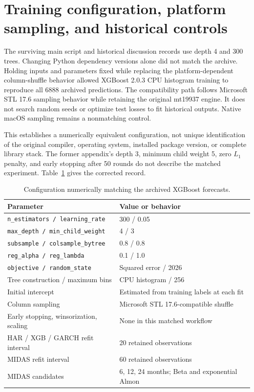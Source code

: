 \appendix
\section{Training configuration, platform sampling, and historical controls}
\label{app:training}
The surviving main script and historical discussion records use depth 4 and 300 trees. Changing Python dependency versions alone did not match the archive. Holding inputs and parameters fixed while replacing the platform-dependent column-shuffle behavior allowed XGBoost 2.0.3 CPU histogram training to reproduce all 6888 archived predictions. The compatibility path follows Microsoft STL 17.6 sampling behavior while retaining the original mt19937 engine. It does not search random seeds or optimize test losses to fit historical outputs. Native macOS sampling remains a nonmatching control.

This establishes a numerically equivalent configuration, not unique identification of the original compiler, operating system, installed package version, or complete library stack. The former appendix's depth 3, minimum child weight 5, zero $L_1$ penalty, and early stopping after 50 rounds do not describe the matched experiment. Table~\ref{tab:training_configuration} gives the corrected record.

\begin{table}[htbp]\centering\small
\caption{Configuration numerically matching the archived XGBoost forecasts.}
\label{tab:training_configuration}
\begin{tabularx}{\textwidth}{lX}\toprule Parameter & Value or behavior\\\midrule
\texttt{n\_estimators / learning\_rate} & 300 / 0.05\\
\texttt{max\_depth / min\_child\_weight} & 4 / 3\\
\texttt{subsample / colsample\_bytree} & 0.8 / 0.8\\
\texttt{reg\_alpha / reg\_lambda} & 0.1 / 1.0\\
\texttt{objective / random\_state} & Squared error / 2026\\
Tree construction / maximum bins & CPU histogram / 256\\
Initial intercept & Estimated from training labels at each fit\\
Column sampling & Microsoft STL 17.6-compatible shuffle\\
Early stopping, winsorization, scaling & None in this matched workflow\\
HAR / XGB / GARCH refit interval & 20 retained observations\\
MIDAS refit interval & 60 retained observations\\
MIDAS candidates & 6, 12, 24 months; Beta and exponential Almon\\\bottomrule
\end{tabularx}
\end{table}

